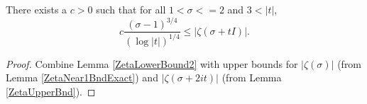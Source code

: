 \begin{lemma}[ZetaLowerBound3]
\label{ZetaLowerBound3}
\leanok
There exists a $c>0$ such that for all $1 < \sigma <= 2$ and $3 < |t|$,
  $$
  c \frac{(\sigma-1)^{3/4}}{(\log |t|)^{1/4}} \le |\zeta(\sigma + tI)|.
  $$
\end{lemma}
\begin{proof}
\leanok
Combine Lemma \ref{ZetaLowerBound2} with upper bounds for
  $|\zeta(\sigma)|$ (from Lemma \ref{ZetaNear1BndExact}) and
  $|\zeta(\sigma+2it)|$ (from Lemma \ref{ZetaUpperBnd}).
\end{proof}
